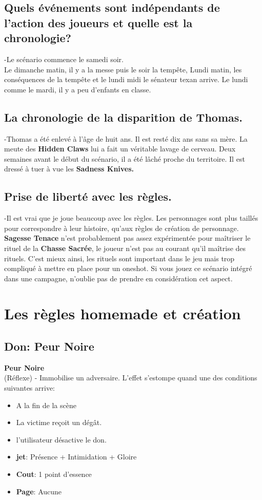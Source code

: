 \documentclass[oneside,12pt]{book}
\newcommand\don[6]{
\textbf{#1} \\
(#6) - #2
\begin{itemize}
\item{ \textbf{jet}: #3}
\item{ \textbf{Cout}: #4}
\item{ \textbf{Page}: #5}
\end{itemize}
\vspace{0.5cm}
}
\newcommand{\Jessica}{\textbf{Sagesse Tenace} }
\newcommand{\Hidden}{\textbf{Hidden Claws} }
\begin{document}
\begin{flushleft}
\subsection{Quels événements sont indépendants de l'action des joueurs et quelle est la chronologie?}
-Le scénario commence le samedi soir. \\
Le dimanche matin, il y a la messe puis le soir la tempête, 
Lundi matin, les conséquences de la tempête et le lundi midi le sénateur texan arrive. Le lundi comme le mardi, 
il y a peu d'enfants en classe. 
\subsection{La chronologie de la disparition de Thomas.} 
-Thomas a été enlevé à l'âge de huit ans. Il est resté dix ans sans sa mère. 
La meute des \Hidden lui a fait un véritable lavage de cerveau. Deux semaines avant le début du scénario, 
il a été lâché proche du territoire. Il est dressé à tuer à vue les \textbf{Sadness Knives.}
\subsection{Prise de liberté avec les règles.} 
-Il est vrai que je joue beaucoup avec les règles. Les personnages sont plus taillés pour correspondre à 
leur histoire, qu'aux règles de création de personnage.
\Jessica  n'est probablement pas assez expérimentée pour maîtriser le rituel de la \textbf{Chasse Sacrée},
le joueur n'est pas au courant qu'il maîtrise des rituels.
C'est mieux ainsi, les rituels sont important dans le jeu mais trop compliqué à mettre en place pour un oneshot.
Si vous jouez ce scénario intégré dans une campagne, n'oublie pas de prendre en considération cet aspect.

\clearpage

\section{Les règles homemade et création}
\subsection{Don: Peur Noire}
\label{Peur_mortelle}
\don{Peur Noire}{Immobilise un adversaire. L'effet s'estompe quand une des conditions suivantes arrive:
\begin{itemize}
\item A la fin de la scène
\item La victime reçoit un dégât. 
\item l'utilisateur désactive le don. 
\end{itemize}}{Présence + Intimidation + Gloire}{1 point d'essence}{Aucune}{Réflexe}



\end{flushleft}
\end{document}
